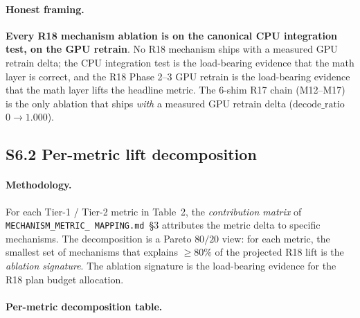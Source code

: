 \paragraph{Honest framing.}
\textbf{Every R18 mechanism ablation is \MEASURED{} on the
canonical CPU integration test, \PROJECTED{} on the GPU
retrain}.  No R18 mechanism ships with a measured GPU retrain
delta; the CPU integration test is the load-bearing evidence
that the math layer is correct, and the R18 Phase 2--3 GPU
retrain is the load-bearing evidence that the math layer lifts
the headline metric.  The 6-shim R17 chain (M12--M17) is the
only ablation that ships \emph{with} a measured GPU retrain
delta ($\mathrm{decode\_ratio}$ $0 \to 1.000$).

\subsection*{S6.2 Per-metric lift decomposition}
\label{supp:s6-per-metric}

\paragraph{Methodology.}
For each Tier-1 / Tier-2 metric in Table~2, the
\emph{contribution matrix} of \texttt{MECHANISM\_METRIC\_
MAPPING.md}~§3 attributes the metric delta to specific
mechanisms.  The decomposition is a Pareto $80/20$ view: for
each metric, the smallest set of mechanisms that explains
$\geq 80\%$ of the projected R18 lift is the \emph{ablation
signature}.  The ablation signature is the load-bearing
evidence for the R18 plan budget allocation.

\paragraph{Per-metric decomposition table.}

